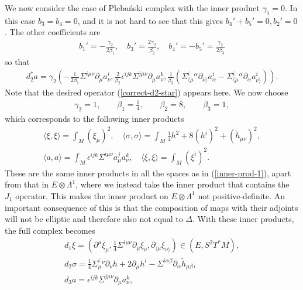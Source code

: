 \documentclass[10pt]{report}
\newcommand{\pleb}[0]{Pleba\'nski}
\theoremstyle{definition}
\begin{document}
We now consider the case of \pleb{} complex with the inner product $\gamma_1=0$. In this case $b_3=b_4=0$, and it is not hard to see that this gives $b_4'+b_5'=0, b_2'=0$. The other coefficients are
\begin{align}
b_1'= -\frac{\gamma_2}{2\beta_1}, \quad b_3'= \frac{2\gamma_2}{\beta_2}, \quad b_4'=-b_5'= \frac{\gamma_2}{2\beta_3}
\end{align}
so that 
\begin{align}\nonumber
d_2^* a = \gamma_2 (-\frac{1}{2\beta_1} \Sigma^{i\mu\nu} \partial_\mu a_\nu^i,  \frac{2}{\beta_2} \epsilon^{ijk} \Sigma^{j\mu\nu} \partial_\mu a_\nu^k, \frac{1}{\beta_3}(\Sigma^i_{\langle\mu}{}^\alpha \partial_{\nu\rangle}a_\alpha^i -\Sigma^i_{\langle\mu}{}^\alpha \partial_\alpha a_{\nu\rangle}^i)).
\end{align}
Note that the desired operator (\ref{correct-d2-star}) appears here. We now choose 
\begin{align}
\gamma_2=1, \qquad \beta_1=\frac{1}{4}, \qquad \beta_2 = 8, \qquad \beta_3=1,
\end{align}
which corresponds to the following inner products
\begin{align}\label{inner-prod-pleb}
\langle \xi,\xi \rangle =\int_M (\xi_\mu)^2, \quad
\langle \sigma,\sigma \rangle = \int_M \frac{1}{4} h^2 +8 (h^i)^2 +  (\tilde{h}_{\mu\nu})^2, \\ \nonumber
\langle a,a\rangle =  \int_M  \epsilon^{ijk} \Sigma^{i\mu\nu} a_\mu^j a_\nu^k, \quad
\langle \xi,\xi\rangle =  \int_M  (\xi^i)^2.
\end{align}
These are the same inner products in all the spaces as in (\ref{inner-prod-1}), apart from that in $E\otimes\Lambda^1$, where we instead take the inner product that contains the $J_1$ operator. This makes the inner product on $E \otimes \Lambda^1$ not positive-definite. An important consequence of this is that the composition of maps with their adjoints will not be elliptic and therefore also not equal to $\Delta$. With these inner products, the full complex becomes
\begin{align}
d_1 \xi = ( \partial^\mu \xi_\mu, \frac{1}{4} \Sigma^{i\mu\nu} \partial_\mu \xi_\nu, \partial_{\langle\mu} \xi_{\nu\rangle}) \in (E,S^2 T^*M) , \\ \nonumber
d_2 \sigma = \frac{1}{4} \Sigma^i_\mu{}^\nu \partial_\nu h +2 \partial_\mu h^i -  \Sigma^{i\alpha\beta} \partial_\alpha \tilde{h}_{\mu\beta} , \\ \nonumber
d_3 a = \epsilon^{ijk} \Sigma^{j\mu\nu} \partial_\mu a_\nu^k,
\end{align}
\end{document}
